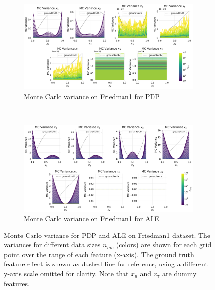 \documentclass[runningheads]{llncs}
\begin{document}
\begin{figure}[h!]
    \centering
    \begin{subfigure}[b]{\textwidth}
        \centering
        \includegraphics[width=\textwidth]{img/Friedman1-all/mc_variance_pdp.png}
        \caption{Monte Carlo variance on Friedman1 for PDP}
    \end{subfigure}
    \\[10pt]
    \vfill
    \begin{subfigure}[b]{\textwidth}
        \centering
        \includegraphics[width=\textwidth]{img/Friedman1-all/mc_variance_ale.png}
        \caption{Monte Carlo variance on Friedman1 for ALE}
    \end{subfigure}
    \caption{Monte Carlo variance for PDP and ALE on Friedman1 dataset.
    The variances for different data sizes $n_{mc}$ (colors) are shown for each grid
    point over the range of each feature (x-axis). The ground truth feature effect is
    shown as dashed line for reference, using a different y-axis scale omitted for
    clarity. Note that $x_6$ and $x_7$ are dummy features.}
    \label{fig:mc-variance-friedman1}  %
\end{figure}
\end{document}
